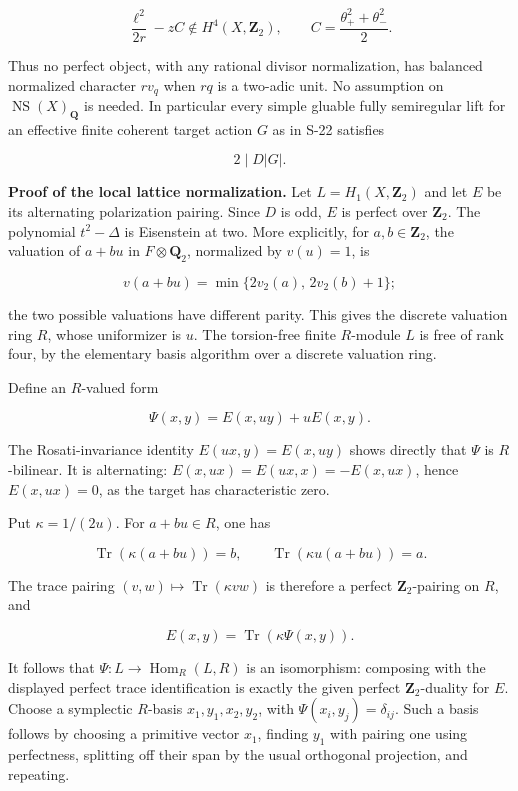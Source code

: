 \[
 \frac{\ell^2}{2r}-zC\notin H^4(X,\mathbf Z_2),\qquad
 C=\frac{\theta_+^2+\theta_-^2}{2}.
 \tag{E807.1}
\]

Thus no perfect object, with any rational divisor normalization, has
balanced normalized character \(r v_q\) when \(rq\) is a two-adic unit.
No assumption on \(\operatorname{NS}(X)_{\mathbf Q}\) is needed. In
particular every simple gluable fully semiregular lift for an effective
finite coherent target action \(G\) as in S-22 satisfies

\[
 2\mid D|G|.
 \tag{E807.2}
\]

\textbf{Proof of the local lattice normalization.} Let
\(L=H_1(X,\mathbf Z_2)\) and let \(E\) be its alternating polarization
pairing. Since \(D\) is odd, \(E\) is perfect over \(\mathbf Z_2\). The
polynomial \(t^2-\Delta\) is Eisenstein at two. More explicitly, for
\(a,b\in\mathbf Z_2\), the valuation of \(a+bu\) in
\(F\otimes\mathbf Q_2\), normalized by \(v(u)=1\), is

\[
 v(a+bu)=\min\{2v_2(a),\,2v_2(b)+1\};
\]

the two possible valuations have different parity. This gives the
discrete valuation ring \(R\), whose uniformizer is \(u\). The
torsion-free finite \(R\)-module \(L\) is free of rank four, by the
elementary basis algorithm over a discrete valuation ring.

Define an \(R\)-valued form

\[
 \Psi(x,y)=E(x,uy)+uE(x,y).
 \tag{E807.3}
\]

The Rosati-invariance identity \(E(ux,y)=E(x,uy)\) shows directly that
\(\Psi\) is \(R\)-bilinear. It is alternating:
\(E(x,ux)=E(ux,x)=-E(x,ux)\), hence \(E(x,ux)=0\), as the target has
characteristic zero.

Put \(\kappa=1/(2u)\). For \(a+bu\in R\), one has

\[
 \operatorname{Tr}(\kappa(a+bu))=b,\qquad
 \operatorname{Tr}(\kappa u(a+bu))=a.
\]

The trace pairing \((v,w)\mapsto\operatorname{Tr}(\kappa vw)\) is
therefore a perfect \(\mathbf Z_2\)-pairing on \(R\), and

\[
 E(x,y)=\operatorname{Tr}(\kappa\Psi(x,y)).
\]

It follows that \(\Psi:L\longrightarrow\operatorname{Hom}_R(L,R)\) is an
isomorphism: composing with the displayed perfect trace identification
is exactly the given perfect \(\mathbf Z_2\)-duality for \(E\). Choose a
symplectic \(R\)-basis \(x_1,y_1,x_2,y_2\), with
\(\Psi(x_i,y_j)=\delta_{ij}\). Such a basis follows by choosing a
primitive vector \(x_1\), finding \(y_1\) with pairing one using
perfectness, splitting off their span by the usual orthogonal
projection, and repeating.

